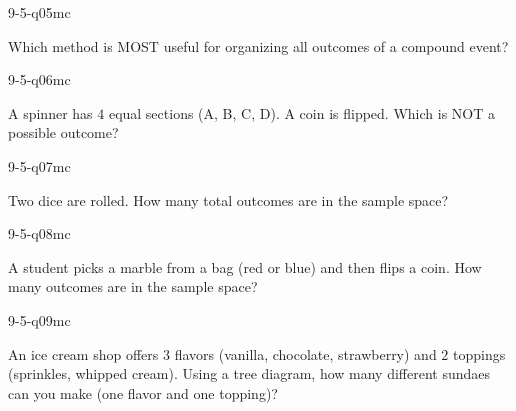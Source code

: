 \begin{practiceQuestion}{9-5-q05}{mc}
\begin{questionText}
Which method is MOST useful for organizing all outcomes of a compound event?
\end{questionText}
\end{practiceQuestion}

\begin{practiceQuestion}{9-5-q06}{mc}
\begin{questionText}
A spinner has $4$ equal sections (A, B, C, D). A coin is flipped. Which is NOT a possible outcome?
\end{questionText}
\end{practiceQuestion}

\begin{practiceQuestion}{9-5-q07}{mc}
\begin{questionText}
Two dice are rolled. How many total outcomes are in the sample space?
\end{questionText}
\end{practiceQuestion}

\begin{practiceQuestion}{9-5-q08}{mc}
\begin{questionText}
A student picks a marble from a bag (red or blue) and then flips a coin. How many outcomes are in the sample space?
\end{questionText}
\end{practiceQuestion}

\begin{practiceQuestion}{9-5-q09}{mc}
\begin{questionText}
An ice cream shop offers $3$ flavors (vanilla, chocolate, strawberry) and $2$ toppings (sprinkles, whipped cream). Using a tree diagram, how many different sundaes can you make (one flavor and one topping)?
\end{questionText}
\end{practiceQuestion}

